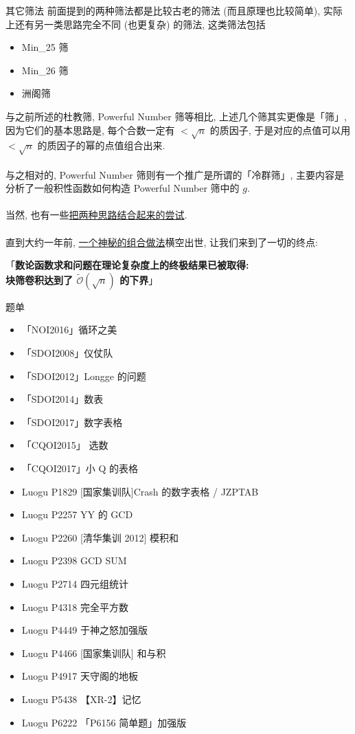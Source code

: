 \documentclass{beamer}
\newcommand{\nl}{\\\hspace*{\fill}\\}
\begin{document}
    \begin{frame}{其它筛法}
        前面提到的两种筛法都是比较古老的筛法 (而且原理也比较简单), 实际上还有另一类思路完全不同 (也更复杂) 的筛法, 这类筛法包括
        \begin{itemize}
            \item Min\_25 筛
            \item Min\_26 筛
            \item 洲阁筛
        \end{itemize}
        与之前所述的杜教筛, Powerful Number 筛等相比, 上述几个筛其实更像是「筛」, 因为它们的基本思路是, 每个合数一定有 $<\sqrt n$ 的质因子, 于是对应的点值可以用 $<\sqrt n$ 的质因子的幂的点值组合出来.\nl
        与之相对的, Powerful Number 筛则有一个推广是所谓的「冷群筛」, 主要内容是分析了一般积性函数如何构造 Powerful Number 筛中的 $g$.\nl
        当然, 也有一些\href{https://negiizhao.blog.uoj.ac/blog/7165}{把两种思路结合起来的尝试}.\nl
        直到大约一年前, \href{https://www.cnblogs.com/zkyJuruo/p/17544928.html}{一个神秘的组合做法}横空出世, 让我们来到了一切的终点: 
        \begin{center}
            「\textbf{数论函数求和问题在理论复杂度上的终极结果已被取得:}\\
            \textbf{块筛卷积达到了 $\widetilde{\mathcal O}(\sqrt n)$ 的下界}」
        \end{center}
    \end{frame}

    \begin{frame}{题单}
        \begin{itemize}
            \item 「NOI2016」循环之美
            \item 「SDOI2008」仪仗队
            \item 「SDOI2012」Longge 的问题
            \item 「SDOI2014」数表
            \item 「SDOI2017」数字表格
            \item 「CQOI2015」 选数
            \item 「CQOI2017」小 Q 的表格
            \item Luogu P1829 [国家集训队]Crash 的数字表格 / JZPTAB
            \item Luogu P2257 YY 的 GCD
            \item Luogu P2260 [清华集训 2012] 模积和
            \item Luogu P2398 GCD SUM
            \item Luogu P2714 四元组统计
            \item Luogu P4318 完全平方数
            \item Luogu P4449 于神之怒加强版
            \item Luogu P4466 [国家集训队] 和与积
            \item Luogu P4917 天守阁的地板
            \item Luogu P5438 【XR-2】记忆
            \item Luogu P6222 「P6156 简单题」加强版
        \end{itemize}
    \end{frame}
\end{document}
